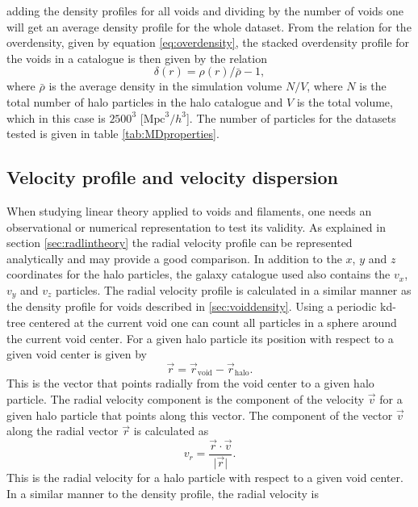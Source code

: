 adding the density profiles for all voids and dividing by the number of voids one
will get an average density profile for the whole dataset. From the relation for the overdensity, given by equation \ref{eq:overdensity},
the stacked overdensity profile for the voids in a catalogue is then given by the relation
\begin{equation}
    \delta(r)=\rho(r)/\bar{\rho}-1,
\end{equation}
where $\bar{\rho}$ is the average density in the simulation volume $N/V$, where $N$ is the total number of halo particles in the halo catalogue
and $V$ is the total volume, which in this case is $2500^3$ [$\mathrm{Mpc}^3/h^3$]. The number of particles for the datasets tested is given in table \ref{tab:MDproperties}. 
\subsection{Velocity profile and velocity dispersion}\label{sec:voidvel}
When studying linear theory applied to voids and filaments, one needs an observational or
numerical representation to test its validity. As explained in section
\ref{sec:radlintheory} the radial velocity profile can be represented analytically and
may provide a good comparison. In addition to the $x$, $y$ and $z$ coordinates for the
halo particles, the galaxy catalogue used also contains the $v_x$, $v_y$ and
$v_z$ particles. The radial velocity profile is calculated in a
similar manner as the density profile for voids described in
\ref{sec:voiddensity}. Using a periodic kd-tree centered at the current void one
can count all particles in a sphere around the current void center. For a given
halo particle its position with respect to a given void center is given by
\begin{equation}\label{eq:voidpos}
    \vec{r}=\vec{r}_{\mathrm{void}}-\vec{r}_{\mathrm{halo}}.
\end{equation}
This is the vector that points radially from the void center to a given halo
particle. The radial velocity component is the component of the velocity $\vec{v}$ for a
given halo particle that points along this vector. The component of the vector
$\vec{v}$ along the radial vector $\vec{r}$ is calculated as
\begin{equation}
    v_r=\frac{\vec{r}\cdot\vec{v}}{\vert\vec{r}\vert}.
\end{equation}
This is the radial velocity for a halo particle with respect to a given void
center. In a similar manner to the density profile, the radial velocity is
